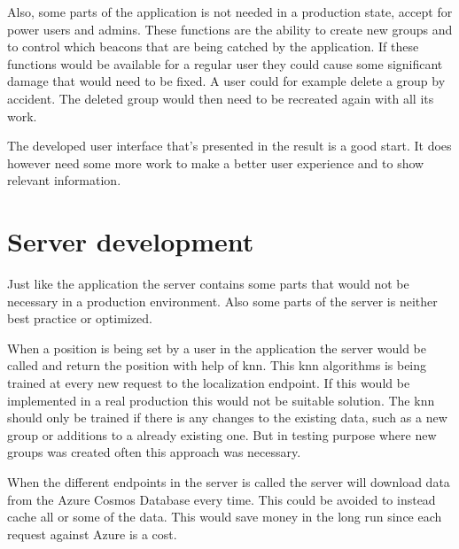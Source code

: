 \bigskip

Also, some parts of the application is not needed in a production state, accept for power users and admins.
These functions are the ability to create new groups and to control which beacons that are being catched by the application.
If these functions would be available for a regular user they could cause some significant damage that would need to be fixed.
A user could for example delete a group by accident.
The deleted group would then need to be recreated again with all its work. 

\bigskip

The developed user interface that's presented in the result is a good start.
It does however need some more work to make a better user experience and to show relevant information.


\section{Server development}\label{sec:}
Just like the application the server contains some parts that would not be necessary in a production environment.
Also some parts of the server is neither best practice or optimized.

\bigskip

When a position is being set by a user in the application the server would be called and return the position with help of \acrfull{knn}.
This \acrshort{knn} algorithms is being trained at every new request to the localization endpoint.
If this would be implemented in a real production this would not be suitable solution.
The \acrshort{knn} should only be trained if there is any changes to the existing data, such as a new group or additions to a already existing one.
But in testing purpose where new groups was created often this approach was necessary.

\bigskip

When the different endpoints in the server is called the server will download data from the Azure Cosmos Database every time. 
This could be avoided to instead cache all or some of the data.
This would save money in the long run since each request against Azure is a cost.


